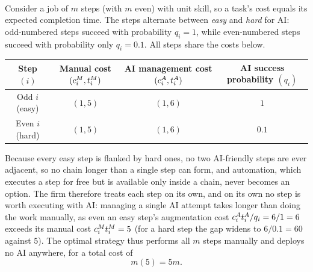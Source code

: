 \documentclass[12pt, final]{article}
\begin{document}
\\[-0.2em]
\noindent{\color{black!25}\rule{\linewidth}{0.4pt}}\par\vspace{1em}
\renewcommand\theexample{\arabic{example}}
\setcounter{example}{1}
\begin{example}
\label{ex:fragmentation_interleaved}
Consider a job of $m$ steps (with $m$ even) with unit skill, so a task's cost equals its expected completion time.
The steps alternate between \emph{easy} and \emph{hard} for AI: odd-numbered steps succeed with probability $q_i = 1$, while even-numbered steps succeed with probability only $q_i = 0.1$.
All steps share the costs below.
\begin{center}
\begin{tabular}{c|ccc}
\toprule
\makecell{Step\\$(i)$} & \makecell{Manual cost\\$(c^{M}_{i}, t^{M}_{i})$} & \makecell{AI management cost\\$(c^{A}_{i}, t^{A}_{i})$} & \makecell{AI success probability\\$(q_i)$} \\
\midrule
Odd $i$ (easy) & $(1, 5)$ & $(1, 6)$ & $1$ \\
Even $i$ (hard) & $(1, 5)$ & $(1, 6)$ & $0.1$ \\
\bottomrule
\end{tabular}
\end{center}

\vspace{0.25cm}



Because every easy step is flanked by hard ones, no two AI-friendly steps are ever adjacent, so no chain longer than a single step can form, and automation, which executes a step for free but is available only inside a chain, never becomes an option.
The firm therefore treats each step on its own, and on its own no step is worth executing with AI: managing a single AI attempt takes longer than doing the work manually, as even an easy step's augmentation cost $c^{A}_{i}t^{A}_{i}/q_i = 6/1 = 6$ exceeds its manual cost $c^{M}_{i}t^{M}_{i} = 5$ (for a hard step the gap widens to $6/0.1 = 60$ against $5$).
The optimal strategy thus performs all $m$ steps manually and deploys no AI anywhere, for a total cost of
\[
m(5) = 5m.
\]
\end{example}
\clearpage
\end{document}
